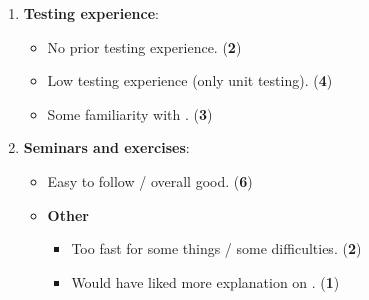 \begin{enumerate}
    \item \textbf{Testing experience}:
    \begin{itemize}
        \item No prior testing experience. (\textbf{2})
        \item Low testing experience (only unit testing). (\textbf{4})
        \item Some familiarity with \tdd. (\textbf{3})
    \end{itemize}

    \item \textbf{Seminars and exercises}:
    \begin{itemize}
        \item Easy to follow / overall good. (\textbf{6})
        \item \textbf{Other}
        \begin{itemize}
            \item Too fast for some things / some difficulties. (\textbf{2})
            \item Would have liked more explanation on \tdd. (\textbf{1})
        \end{itemize}
    \end{itemize}
\end{enumerate}



